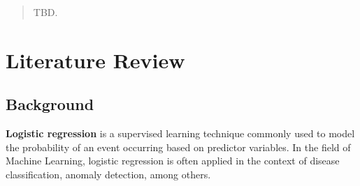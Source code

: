 \documentclass{article}
\theoremstyle{plain}
\theoremstyle{definition}
\theoremstyle{remark}
\begin{document}



\printAffiliationsAndNotice{\icmlEqualContribution} %

\begin{abstract}
TBD.
\end{abstract}

\section{Literature Review}
\label{submission}

\subsection{Background}

\textbf{Logistic regression} is a supervised learning technique commonly used to model the probability of an event occurring based on predictor variables. In the field of Machine Learning, logistic regression is often applied in the context of disease classification, anomaly detection, among others.
\end{document}
